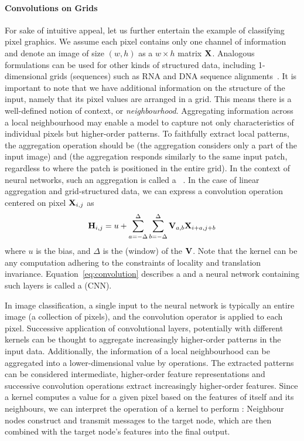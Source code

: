\documentclass[
	fontsize=10pt, %
	twoside=true, %
	secnumdepth=1, %
  toc=indentunnumbered %
]{kaobook}
\begin{document}
\paragraph{Convolutions on Grids}
For sake of intuitive appeal, let us further entertain the example of
classifying pixel graphics. We assume each pixel contains only one channel of
information and denote an image of size $(w,h)$ as a $w \times h$ matrix $\mathbf{X}$. Analogous formulations can be used for other kinds of structured data,
including 1-dimensional grids (sequences) such as RNA and DNA sequence
alignments~\cite{flagel_UnreasonableEffectivenessConvolutional_2019,aoki_ConvolutionalNeuralNetworks_2018}.
It is important to note that we have additional information on the structure of
the input,
namely that its pixel values are arranged in a grid. This means there is a
well-defined notion of context, or \textit{neighbourhood}.
%
Aggregating information across a local neighbourhood may enable
a model to capture not only characteristics of individual pixels but
higher-order patterns. To faithfully extract local patterns, the aggregation
operation should be  (the aggregation considers only a part of the
input image) and  (the aggregation responds
similarly to the same input patch, regardless to where the patch is positioned in the
entire grid). In the context of neural networks, such an aggregation is called a
~\cite{zhang_dive_nodate}. In the case of linear aggregation
and grid-structured data, we can express a convolution operation centered on pixel $\mathbf{X}_{i,j}$ as
\begin{align}
  \mathbf{H}_{i,j} = u + \sum_{a= -\Delta}^\Delta \sum_{b = -\Delta}^\Delta \mathbf{V}_{a,b} \mathbf{X}_{i+a,j+b}
  \label{eq:convolution}
\end{align}
where $u$ is the bias, and $\Delta$ is the (window)  of the
 $\mathbf{V}$.
%
Note that the kernel can be any
computation adhering to the constraints of locality and translation invariance.
%
Equation~\ref{eq:convolution} describes a
 and a neural network containing such layers is called
a  (CNN).

In image classification, a single input to the neural network is typically an
entire image (a collection of pixels), and the convolution operator is applied
to each pixel. 
%
Successive application of convolutional layers,
potentially with different kernels can be thought to aggregate increasingly
higher-order patterns in the input data. Additionally, the information of a
local neighbourhood can be aggregated into a lower-dimensional value by
 operations.
%
The extracted patterns can be
considered intermediate, higher-order feature representations and successive
convolution operations extract increasingly higher-order features.
%
Since a kernel computes a value for a given pixel based on the features of
itself and its neighbours, we can interpret the operation of a kernel to perform
: Neighbour nodes construct and transmit messages to the
target node, which are then combined with the target node's features into the
final output.
\end{document}
